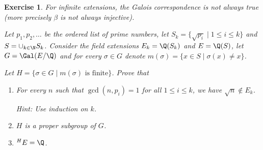 \documentclass[a4paper,10pt,reqno]{amsart}
\newtheorem{ex}{Exercise}[section]
\begin{document}
\begin{ex}
\label{8.2}
For infinite extensions, the Galois correspondence is not always true (more precisely $\beta$ is not always injective).

Let $p_1,p_2,\dots$ be the ordered list of prime numbers, let
$S_k=\{\sqrt{p_i}\mid 1\leq i\leq k\}$ and 
$S=\cup_{k\in\N} S_k$.
Consider the field 
extensions $E_k=\Q(S_k)$ 
and $E=\Q(S)$,
let $G=\Gal(E/\Q)$ and for every $\sigma\in G$ 
denote $m(\sigma)=\{x\in S\mid \sigma(x)\neq x\}$.

Let $H=\{\sigma \in G\mid m(\sigma)\text{ is finite}\}$.
Prove that
\begin{enumerate}[label=(\roman*)]
        \item  
        For every $n$ such that $\gcd(n,p_i)=1$ for all $1\leq i\leq k$, 
        we have $\sqrt{n}\notin E_k$.

        \noindent\textit{Hint:} Use induction on $k$.
        \item $H$ is a proper subgroup of $G$.
        \item ${}^HE=\Q$.
    \end{enumerate}

\end{ex}
\end{document}
